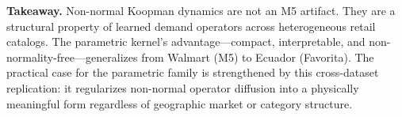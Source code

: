 \documentclass[10pt]{article} %
\theoremstyle{plain}
\theoremstyle{definition}
\begin{document}
\begin{table}[ht]
\centering
\footnotesize
\setlength{\tabcolsep}{4pt}
\caption{Cross-dataset comparison of Koopman spectral properties and operational metrics.}
\label{tab:edmd_cross_dataset}
\end{table}

\textbf{Takeaway.} Non-normal Koopman dynamics are not an M5 artifact. They are a structural property of learned demand operators across heterogeneous retail catalogs. The parametric kernel's advantage---compact, interpretable, and non-normality-free---generalizes from Walmart (M5) to Ecuador (Favorita). The practical case for the parametric family is strengthened by this cross-dataset replication: it regularizes non-normal operator diffusion into a physically meaningful form regardless of geographic market or category structure.
\end{document}
